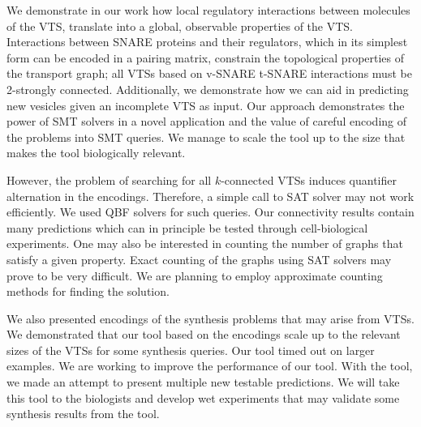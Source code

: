 \noindent 
We demonstrate in our work how local regulatory interactions between molecules of the VTS, translate
into a global, observable properties of the VTS. 
%
Interactions between SNARE proteins and their
regulators, which in its simplest form can be encoded in a pairing matrix, constrain the topological
properties of the transport graph; all VTSs based on v-SNARE t-SNARE interactions must be 2-strongly connected.
% 
Additionally, we demonstrate how we can aid in predicting new vesicles given an incomplete VTS as input. 
%
Our approach demonstrates the power of SMT solvers in a novel application and the value of careful encoding of the problems into SMT queries. 
%
We manage to scale the tool up
to the size that makes the tool biologically relevant.
%

However, the problem of searching for all $k$-connected VTSs induces quantifier alternation in the encodings.
%
Therefore, a simple call to SAT solver may not work efficiently. 
%
We used QBF solvers for such queries.
%
Our connectivity results contain many predictions which can in principle be tested through cell-biological experiments. 
%
One may also be interested in counting the number of graphs that satisfy
a given property. 
%
Exact counting of the graphs using SAT solvers may prove to be very
difficult. 
%
We are planning to employ approximate counting methods for finding the solution.
%

We also presented encodings of the synthesis problems that may arise from VTSs.
%
We demonstrated that our tool based on the encodings
scale up to the relevant sizes of the VTSs for some synthesis queries.
%
Our tool timed out on larger examples.
%
We are working to improve the performance of our tool.
%
%
With the tool, we made an attempt to present multiple new testable predictions. 
%
We will take this tool to the biologists and develop wet experiments that may
validate some synthesis results from the tool.
%
%

